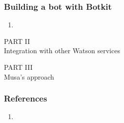 \documentclass[11pt]{beamer}
\begin{document}
\begin{frame}
	\frametitle{Building a bot with Botkit}
	\begin{enumerate}
		\item 
	\end{enumerate}
\end{frame}

\begin{frame}
	\begin{center}
		PART II \\ Integration with other Watson services
	\end{center}
\end{frame}

\begin{frame}
	\begin{center}
		PART III \\ Musa's approach
	\end{center}
\end{frame}

\begin{frame}
\frametitle{References}
\begin{enumerate}
	\item 
\end{enumerate}
\end{frame}
\end{document}
